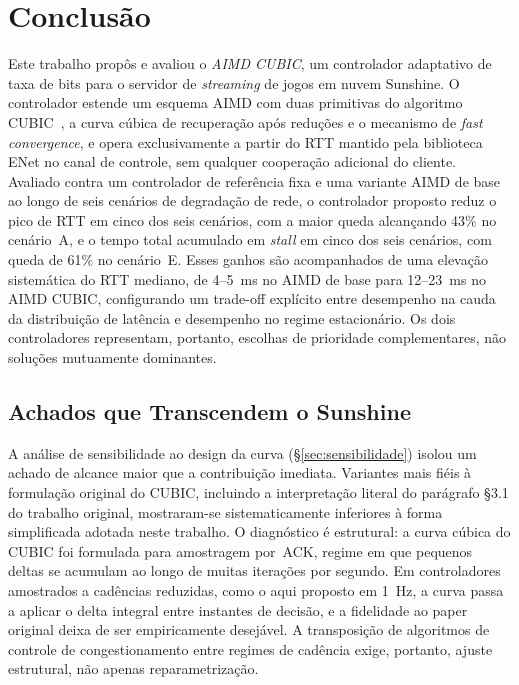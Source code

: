 \section{Conclusão}\label{sec:conclusao}

Este trabalho propôs e avaliou o \emph{AIMD CUBIC}, um
controlador adaptativo de taxa de bits para o servidor de
\emph{streaming} de jogos em nuvem Sunshine. O controlador
estende um esquema AIMD com duas primitivas do algoritmo
CUBIC~\cite{cubic}, a curva cúbica de recuperação após
reduções e o mecanismo de \emph{fast convergence}, e opera
exclusivamente a partir do RTT mantido pela biblioteca ENet
no canal de controle, sem qualquer cooperação adicional do
cliente. Avaliado contra um controlador de referência fixa e
uma variante AIMD de base ao longo de seis cenários de
degradação de rede, o controlador proposto reduz o pico de
RTT em cinco dos seis cenários, com a maior queda alcançando
43\% no cenário~A, e o tempo total acumulado em \emph{stall}
em cinco dos seis cenários, com queda de 61\% no cenário~E.
Esses ganhos são acompanhados de uma elevação sistemática do
RTT mediano, de 4--5~ms no AIMD de base para 12--23~ms no
AIMD CUBIC, configurando um trade-off explícito entre
desempenho na cauda da distribuição de latência e desempenho
no regime estacionário. Os dois controladores representam,
portanto, escolhas de prioridade complementares, não soluções
mutuamente dominantes.

\subsection{Achados que Transcendem o Sunshine}

A análise de sensibilidade ao design da curva (§\ref{sec:sensibilidade})
isolou um achado de alcance maior que a contribuição
imediata. Variantes mais fiéis à formulação original do CUBIC,
incluindo a interpretação literal do parágrafo §3.1 do
trabalho original, mostraram-se sistematicamente inferiores à
forma simplificada adotada neste trabalho. O diagnóstico é
estrutural: a curva cúbica do CUBIC foi formulada para
amostragem por~ACK, regime em que pequenos deltas se acumulam
ao longo de muitas iterações por segundo. Em controladores
amostrados a cadências reduzidas, como o aqui proposto em
1~Hz, a curva passa a aplicar o delta integral entre instantes
de decisão, e a fidelidade ao paper original deixa de ser
empiricamente desejável. A transposição de algoritmos de
controle de congestionamento entre regimes de cadência exige,
portanto, ajuste estrutural, não apenas reparametrização.

